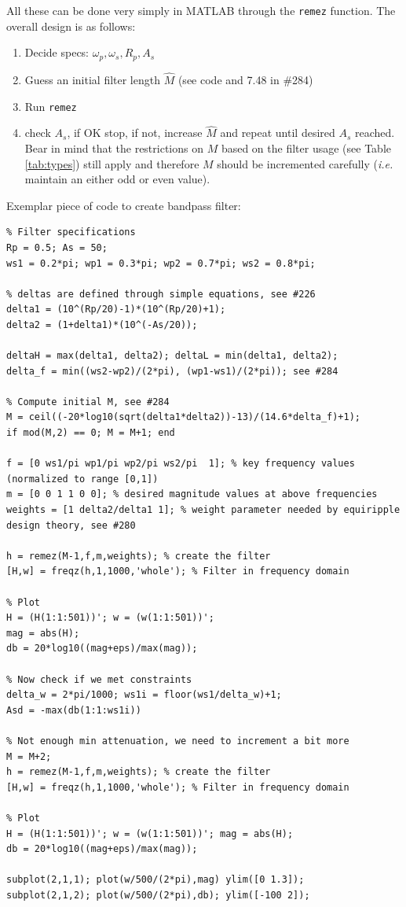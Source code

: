 \documentclass{article}
\newcommand{\ttt}[1]{\texttt{#1}}
\newcommand{\ie}{\textit{i.e. }}
\begin{document}
All these can be done very simply in MATLAB through the \ttt{remez} function. The overall design is as follows:
\begin{enumerate}
\item Decide specs: $\omega_p, \omega_s, R_p, A_s$
\item Guess an initial filter length $\hat{M}$ (see code and 7.48 in \#284)
\item Run \ttt{remez}
\item check $A_s$, if OK stop, if not, increase $\hat{M}$ and repeat until desired $A_s$ reached. Bear in mind that the restrictions on $M$ based on the filter usage (see Table \ref{tab:types}) still apply and therefore $M$ should be incremented carefully (\ie maintain an either odd or even value).
\end{enumerate}


Exemplar piece of code to create bandpass filter: 
{
\footnotesize
\begin{verbatim}
% Filter specifications
Rp = 0.5; As = 50;
ws1 = 0.2*pi; wp1 = 0.3*pi; wp2 = 0.7*pi; ws2 = 0.8*pi;

% deltas are defined through simple equations, see #226
delta1 = (10^(Rp/20)-1)*(10^(Rp/20)+1);
delta2 = (1+delta1)*(10^(-As/20));

deltaH = max(delta1, delta2); deltaL = min(delta1, delta2);
delta_f = min((ws2-wp2)/(2*pi), (wp1-ws1)/(2*pi)); see #284

% Compute initial M, see #284
M = ceil((-20*log10(sqrt(delta1*delta2))-13)/(14.6*delta_f)+1);
if mod(M,2) == 0; M = M+1; end

f = [0 ws1/pi wp1/pi wp2/pi ws2/pi  1]; % key frequency values (normalized to range [0,1])
m = [0 0 1 1 0 0]; % desired magnitude values at above frequencies
weights = [1 delta2/delta1 1]; % weight parameter needed by equiripple design theory, see #280

h = remez(M-1,f,m,weights); % create the filter
[H,w] = freqz(h,1,1000,'whole'); % Filter in frequency domain

% Plot
H = (H(1:1:501))'; w = (w(1:1:501))';
mag = abs(H);
db = 20*log10((mag+eps)/max(mag));

% Now check if we met constraints
delta_w = 2*pi/1000; ws1i = floor(ws1/delta_w)+1;
Asd = -max(db(1:1:ws1i))

% Not enough min attenuation, we need to increment a bit more
M = M+2;
h = remez(M-1,f,m,weights); % create the filter
[H,w] = freqz(h,1,1000,'whole'); % Filter in frequency domain

% Plot
H = (H(1:1:501))'; w = (w(1:1:501))'; mag = abs(H);
db = 20*log10((mag+eps)/max(mag));

subplot(2,1,1); plot(w/500/(2*pi),mag) ylim([0 1.3]);
subplot(2,1,2); plot(w/500/(2*pi),db); ylim([-100 2]);
\end{verbatim}
}
\end{document}
